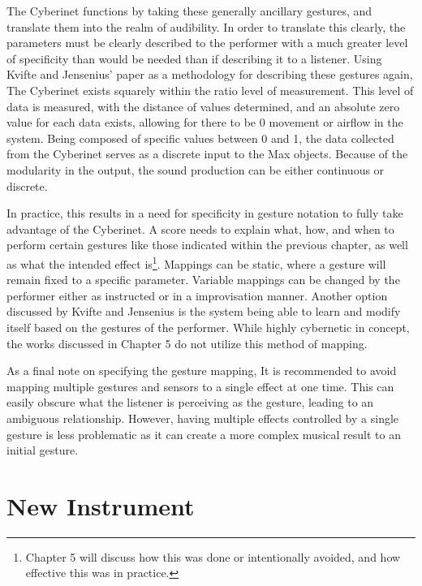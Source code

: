 The Cyberinet functions by taking these generally ancillary gestures, and translate them into the realm of audibility. In order to translate this clearly, the parameters must be clearly described to the performer with a much greater level of specificity than would be needed than if describing it to a listener\cite{KvifteJenseniusDescription}. Using Kvifte and Jensenius' paper as a methodology for describing these gestures again, The Cyberinet exists squarely within the ratio level of measurement. This level of data is measured, with the distance of values determined, and an absolute zero value for each data exists, allowing for there to be 0 movement or airflow in the system. Being composed of specific values between 0 and 1, the data collected from the Cyberinet serves as a discrete input to the Max objects. Because of the modularity in the output, the sound production can be either continuous or discrete.

In practice, this results in a need for specificity in gesture notation to fully take advantage of the Cyberinet. A score needs to explain what, how, and when to perform certain gestures like those indicated within the previous chapter, as well as what the intended effect is\footnote{Chapter 5 will discuss how this was done or intentionally avoided, and how effective this was in practice.}. Mappings can be static, where a gesture will remain fixed to a specific parameter. Variable mappings can be changed by the performer either as instructed or in a improvisation manner. Another option discussed by Kvifte and Jensenius is the system being able to learn and modify itself based on the gestures of the performer\cite{KvifteJenseniusDescription}. While highly cybernetic in concept, the works discussed in Chapter 5 do not utilize this method of mapping.

As a final note on specifying the gesture mapping, It is recommended to avoid mapping multiple gestures and sensors to a single effect at one time. This can easily obscure what the listener is perceiving as the gesture, leading to an ambiguous relationship. However, having multiple effects controlled by a single gesture is less problematic as it can create a more complex musical result to an initial gesture.


\section{New Instrument}

